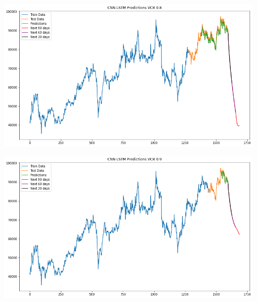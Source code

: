 \documentclass[conference]{IEEEtran}
\begin{document}
\begin{minipage}{0.23\textwidth}
    \centering
    \includegraphics[width=\linewidth]{images/CNN-LSTM/CNNLSTM_VCB_82.png}
    \label{fig:image1}
\end{minipage}
\hfill
\begin{minipage}{0.23\textwidth}
    \centering
    \includegraphics[width=\linewidth]{images/CNN-LSTM/CNNLSTM_VCB_91.png}
    \label{fig:image2}
\end{minipage}
\end{document}
